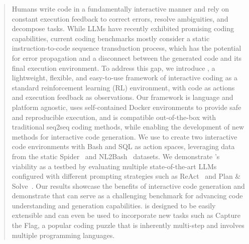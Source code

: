 \begin{abstract}
Humans write code in a fundamentally interactive manner and rely on constant execution feedback to correct errors, resolve ambiguities, and decompose tasks. While LLMs have recently exhibited promising coding capabilities, current coding benchmarks mostly consider a static instruction-to-code sequence transduction process, which has the potential for error propagation and a disconnect between the generated code and its final execution environment. To address this gap, we introduce \benchmark{}, a lightweight, flexible, and easy-to-use framework of interactive coding as a standard reinforcement learning (RL) environment, with code as actions and execution feedback as observations. Our framework is language and platform agnostic, uses self-contained Docker environments to provide safe and reproducible execution, and is compatible out-of-the-box with traditional seq2seq coding methods, while enabling the development of new methods for interactive code generation.
We use \benchmark{} to create two interactive code environments with Bash and SQL as action spaces, leveraging data from the static Spider~\cite{yu-etal-2018-spider} and NL2Bash~\cite{lin-etal-2018-nl2bash} datasets. We demonstrate \benchmark{}'s viability as a testbed by evaluating multiple state-of-the-art LLMs configured with different prompting strategies such as ReAct~\cite{yao2023react} and Plan \& Solve~\cite{wang2023planandsolve}. Our results showcase the benefits of interactive code generation and demonstrate that \benchmark{} can serve as a challenging benchmark for advancing code understanding and generation capabilities. \benchmark{} is designed to be easily extensible and can even be used to incorporate new tasks such as Capture the Flag, a popular coding puzzle that is inherently multi-step and involves multiple programming languages.
\end{abstract}